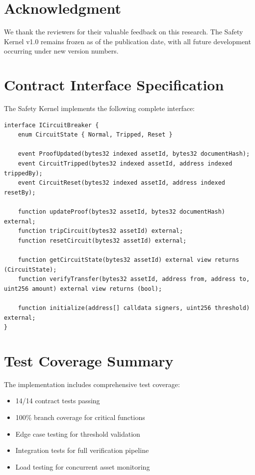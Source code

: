 \documentclass[10pt,conference]{IEEEtran}
\begin{document}
\section*{Acknowledgment}
\label{sec:acknowledgment}

We thank the reviewers for their valuable feedback on this research. The Safety Kernel v1.0 remains frozen as of the publication date, with all future development occurring under new version numbers.




\appendix

\section{Contract Interface Specification}
\label{app:contract_interface}

The Safety Kernel implements the following complete interface:

\begin{lstlisting}[language=Solidity,caption=Complete Contract Interface]
interface ICircuitBreaker {
    enum CircuitState { Normal, Tripped, Reset }
    
    event ProofUpdated(bytes32 indexed assetId, bytes32 documentHash);
    event CircuitTripped(bytes32 indexed assetId, address indexed trippedBy);
    event CircuitReset(bytes32 indexed assetId, address indexed resetBy);
    
    function updateProof(bytes32 assetId, bytes32 documentHash) external;
    function tripCircuit(bytes32 assetId) external;
    function resetCircuit(bytes32 assetId) external;
    
    function getCircuitState(bytes32 assetId) external view returns (CircuitState);
    function verifyTransfer(bytes32 assetId, address from, address to, uint256 amount) external view returns (bool);
    
    function initialize(address[] calldata signers, uint256 threshold) external;
}
\end{lstlisting}

\section{Test Coverage Summary}
\label{app:test_coverage}

The implementation includes comprehensive test coverage:

\begin{itemize}
\item 14/14 contract tests passing
\item 100\% branch coverage for critical functions
\item Edge case testing for threshold validation
\item Integration tests for full verification pipeline
\item Load testing for concurrent asset monitoring
\end{itemize}
\end{document}
